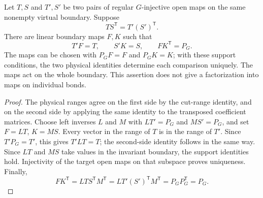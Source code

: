 \begin{lemma}%
    \label{thm:peps_regular_ginjective_cut_comparison}
    \leanok
    Let $T,S$ and $T',S'$ be two pairs of regular $G$-injective
    open maps on the same nonempty virtual boundary. Suppose
    \[
        TS^{\mathsf T}=T'(S')^{\mathsf T}.
    \]
    There are linear boundary maps $F,K$ such that
    \[
        T'F=T,\qquad S'K=S,\qquad FK^{\mathsf T}=P_G.
    \]
    The maps can be chosen with $P_GF=F$ and $P_GK=K$; with
    these support conditions, the two physical identities
    determine each comparison uniquely. The maps act on the whole boundary. This assertion does not
    give a factorization into maps on individual bonds.
\end{lemma}

\begin{proof}\leanok
    The physical ranges agree on the first side by the cut-range
    identity, and on the second side by applying the same identity
    to the transposed coefficient matrices. Choose left inverses
    $L$ and $M$ with $LT'=P_G$ and $MS'=P_G$, and set
    $F=LT$, $K=MS$. Every vector in the range of $T$ is in the
    range of $T'$. Since $T'P_G=T'$, this gives $T'LT=T$;
    the second-side identity follows in the same way. Since
    $LT$ and $MS$ take values in the invariant boundary, the
    support identities hold. Injectivity of the target open maps
    on that subspace proves uniqueness. Finally,
    \[
        FK^{\mathsf T}
        =LTS^{\mathsf T}M^{\mathsf T}
        =LT'(S')^{\mathsf T}M^{\mathsf T}
        =P_GP_G^{\mathsf T}=P_G.
    \]
\end{proof}
